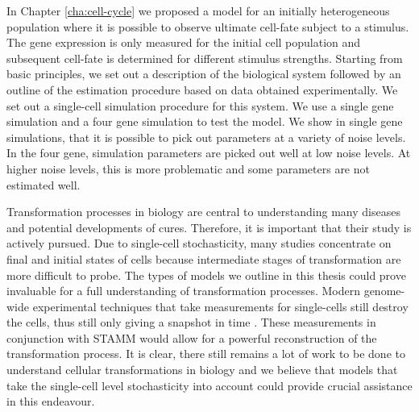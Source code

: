 In Chapter \ref{cha:cell-cycle} we proposed a model for an initially heterogeneous population where it is possible to observe ultimate cell-fate subject to a stimulus. The gene expression is only measured for the initial cell population and subsequent cell-fate is determined for different stimulus strengths. Starting from basic principles, we set out a description of the biological system followed by an outline of the estimation procedure based on data obtained experimentally. We set out a single-cell simulation procedure for this system. We use a single gene simulation and a four gene simulation to test the model. We show in single gene simulations, that it is possible to pick out parameters at a variety of noise levels. In the four gene, simulation parameters are picked out well at low noise levels. At higher noise levels, this is more problematic and some parameters are not estimated well.

Transformation processes in biology are central to understanding many diseases and potential developments of cures. Therefore, it is important that their study is actively pursued. Due to single-cell stochasticity, many studies concentrate on final and initial states of cells because intermediate stages of transformation are more difficult to probe. The types of models we outline in this thesis could prove invaluable for a full understanding of transformation processes. Modern genome-wide experimental techniques that take measurements for single-cells still destroy the cells, thus still only giving a snapshot in time \citep{deSouza:2012dz}. These measurements in conjunction with STAMM would allow for a powerful reconstruction of the transformation process. It is clear, there still remains a lot of work to be done to understand cellular transformations in biology and we believe that models that take the single-cell level stochasticity into account could provide crucial assistance in this endeavour.


